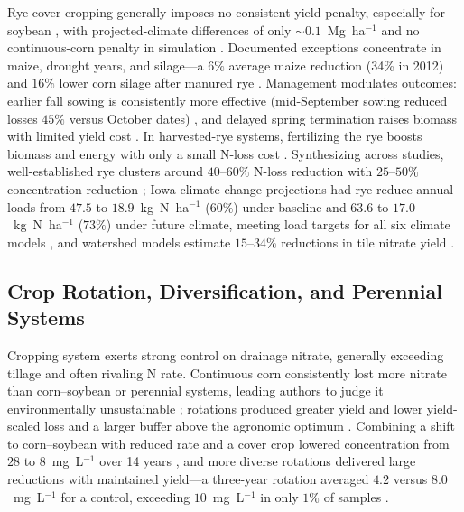 Rye cover cropping generally imposes no consistent yield penalty, especially
for soybean \parencite{Strock2004,Waring2020,Qi2011b}, with projected-climate
differences of only $\sim0.1$~Mg~ha$^{-1}$ and no continuous-corn penalty in
simulation \parencite{Malone2020,Birru2023}. Documented exceptions concentrate
in maize, drought years, and silage---a $6\%$ average maize reduction (34\% in
2012) \parencite{MartinezFeria2016} and $16\%$ lower corn silage after manured
rye \parencite{Krueger2013}. Management modulates outcomes: earlier fall
sowing is consistently more effective (mid-September sowing reduced losses
$45\%$ versus October dates) \parencite{Feyereisen2006b}, and delayed spring
termination raises biomass with limited yield cost \parencite{Birru2023,Chatterjee2025}.
In harvested-rye systems, fertilizing the rye boosts biomass and energy with
only a small N-loss cost \parencite{Malone2018,Malone2023}. Synthesizing
across studies, well-established rye clusters around $40$--$60\%$ N-loss
reduction with $25$--$50\%$ concentration reduction
\parencite{Malone2018,Chatterjee2025,Malone2014b,Malone2023}; Iowa
climate-change projections had rye reduce annual loads from $47.5$ to
$18.9$~kg~N~ha$^{-1}$ ($60\%$) under baseline and $63.6$ to
$17.0$~kg~N~ha$^{-1}$ ($73\%$) under future climate, meeting load targets for
all six climate models \parencite{Malone2020}, and watershed models estimate
$15$--$34\%$ reductions in tile nitrate yield
\parencite{David2015,Makhtoumi2025,Gupta2023}.

\subsection{Crop Rotation, Diversification, and Perennial Systems}

Cropping system exerts strong control on drainage nitrate, generally
exceeding tillage and often rivaling N rate. Continuous corn consistently lost
more nitrate than corn--soybean or perennial systems, leading authors to judge
it environmentally unsustainable \parencite{Weed1996,Kanwar1997}; rotations
produced greater yield and lower yield-scaled loss and a larger buffer above
the agronomic optimum \parencite{Zhao2016,Pasley2021}. Combining a shift to
corn--soybean with reduced rate and a cover crop lowered concentration from
$28$ to $8$~mg~L$^{-1}$ over 14 years \parencite{Ritter2015}, and more diverse
rotations delivered large reductions with maintained yield---a three-year
rotation averaged $4.2$ versus $8.0$~mg~L$^{-1}$ for a control, exceeding
$10$~mg~L$^{-1}$ in only $1\%$ of samples \parencite{Gentry2025,Ahmed2007b}.

